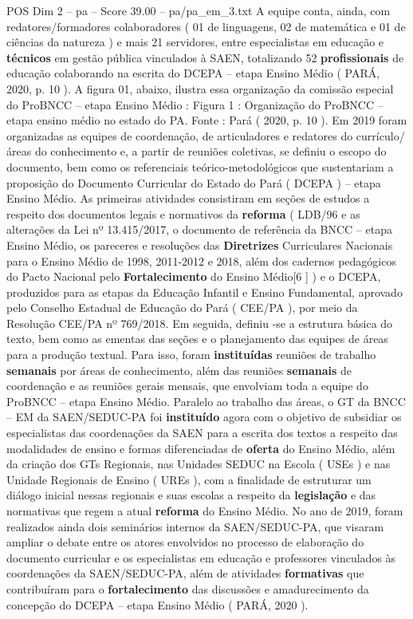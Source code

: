 \begin{textsample}{POS Dim 2 – pa – Score 39.00 – pa/pa\_em\_3.txt}
A equipe conta, ainda, com redatores/formadores colaboradores ( 01 de linguagens, 02 de matemática e 01 de ciências da natureza ) e mais 21 servidores, entre especialistas em educação e \textbf{técnicos} em gestão pública vinculados à SAEN, totalizando 52 \textbf{profissionais} de educação colaborando na escrita do DCEPA – etapa Ensino Médio ( PARÁ, 2020, p. 10 ).
A figura 01, abaixo, ilustra essa organização da comissão especial do ProBNCC – etapa Ensino Médio : Figura 1 : Organização do ProBNCC – etapa ensino médio no estado do PA.
Fonte : Pará ( 2020, p. 10 ).
Em 2019 foram organizadas as equipes de coordenação, de articuladores e redatores do currículo/áreas do conhecimento e, a partir de reuniões coletivas, se definiu o escopo do documento, bem como os referenciais teórico-metodológicos que sustentariam a proposição do Documento Curricular do Estado do Pará ( DCEPA ) – etapa Ensino Médio.
As primeiras atividades consistiram em seções de estudos a respeito dos documentos legais e normativos da \textbf{reforma} ( LDB/96 e as alterações da Lei nº 13.415/2017, o documento de referência da BNCC – etapa Ensino Médio, os pareceres e resoluções das \textbf{Diretrizes} Curriculares Nacionais para o Ensino Médio de 1998, 2011-2012 e 2018, além dos cadernos pedagógicos do Pacto Nacional pelo \textbf{Fortalecimento} do Ensino Médio[6 ] ) e o DCEPA, produzidos para as etapas da Educação Infantil e Ensino Fundamental, aprovado pelo Conselho Estadual de Educação do Pará ( CEE/PA ), por meio da Resolução CEE/PA nº 769/2018.
Em seguida, definiu -se a estrutura básica do texto, bem como as ementas das seções e o planejamento das equipes de áreas para a produção textual.
Para isso, foram \textbf{instituídas} reuniões de trabalho \textbf{semanais} por áreas de conhecimento, além das reuniões \textbf{semanais} de coordenação e as reuniões gerais mensais, que envolviam toda a equipe do ProBNCC – etapa Ensino Médio.
Paralelo ao trabalho das áreas, o GT da BNCC – EM da SAEN/SEDUC-PA foi \textbf{instituído} agora com o objetivo de subsidiar os especialistas das coordenações da SAEN para a escrita dos textos a respeito das modalidades de ensino e formas diferenciadas de \textbf{oferta} do Ensino Médio, além da criação dos GTs Regionais, nas Unidades SEDUC na Escola ( USEs ) e nas Unidade Regionais de Ensino ( UREs ), com a finalidade de estruturar um diálogo inicial nessas regionais e suas escolas a respeito da \textbf{legislação} e das normativas que regem a atual \textbf{reforma} do Ensino Médio.
No ano de 2019, foram realizados ainda dois seminários internos da SAEN/SEDUC-PA, que visaram ampliar o debate entre os atores envolvidos no processo de elaboração do documento curricular e os especialistas em educação e professores vinculados às coordenações da SAEN/SEDUC-PA, além de atividades \textbf{formativas} que contribuíram para o \textbf{fortalecimento} das discussões e amadurecimento da concepção do DCEPA – etapa Ensino Médio ( PARÁ, 2020 ).

\end{textsample}

